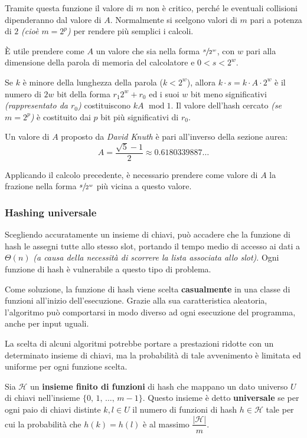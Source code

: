 \documentclass[italian, 10pt]{article}
\DeclareMathOperator{\modop}{\ mod}
\begin{document}
Tramite questa funzione il valore di \(m\) non è critico, perché le eventuali collisioni dipenderanno dal valore di \(A\).
Normalmente si scelgono valori di \(m\) pari a potenza di \(2\) \textit{(cioè \(m = 2^p\))} per rendere più semplici i calcoli.

\bigskip
È utile prendere come \(A\) un valore che sia nella forma \(\sfrac{s}{2^w}\), con \(w\) pari alla dimensione della parola di memoria del calcolatore e \(0 < s < 2^w\).

Se \(k\) è minore della lunghezza della parola (\(k < 2^w\)), allora \(k \cdot s = k \cdot A \cdot 2^w\) è il numero di \(2w\) bit della forma \(r_1 2^w + r_0\) ed i suoi \(w\) bit meno significativi \textit{(rappresentato da \(r_0\))} costituiscono \(kA \modop 1\).
Il valore dell'hash cercato \textit{(se \(m = 2^p\))} è costituito dai \(p\) bit più significativi di \(r_0\).

Un valore di \(A\) proposto da \textit{David Knuth} è pari all'inverso della sezione aurea:
\[ A = \dfrac{\sqrt{5} - 1}{2} \approx 0.6180339887 \ldots \]

Applicando il calcolo precedente, è necessario prendere come valore di \(A\) la frazione nella forma \(\sfrac{s}{2^w}\) più vicina a questo valore.

\subsubsection{Hashing universale}

Scegliendo accuratamente un insieme di chiavi, può accadere che la funzione di hash le assegni tutte allo stesso slot, portando il tempo medio di accesso ai dati a \(\Theta(n)\) \textit{(a causa della necessità di scorrere la lista associata allo slot)}.
Ogni funzione di hash è vulnerabile a questo tipo di problema.

Come soluzione, la funzione di hash viene scelta \textbf{casualmente} in una classe di funzioni all'inizio dell'esecuzione.
Grazie alla sua caratteristica aleatoria, l'algoritmo può comportarsi in modo diverso ad ogni esecuzione del programma, anche per input uguali.

La scelta di alcuni algoritmi potrebbe portare a prestazioni ridotte con un determinato insieme di chiavi, ma la probabilità di tale avvenimento è limitata ed uniforme per ogni funzione scelta.

\bigskip
Sia \(\mathscr{H}\) un \textbf{insieme finito di funzioni} di hash che mappano un dato universo \(U\) di chiavi nell'insieme \(\{0,\, 1, \, \ldots, \, m-1\}\).
Questo insieme è detto \textbf{universale} se per ogni paio di chiavi distinte \(k, l \in U\) il numero di funzioni di hash \(h \in \mathscr{H}\) tale per cui la probabilità che \(h(k) = h(l)\) è al massimo \(\dfrac{|\mathscr{H}|}{m}\).
\end{document}

